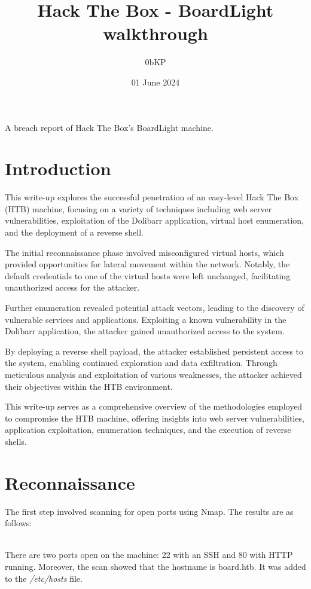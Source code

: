 \documentclass[12pt, letterpaper]{article}
\title{Hack The Box - BoardLight walkthrough}
\author{0bKP}
\date{01 June 2024}
\begin{document}
\maketitle
A breach report of Hack The Box's BoardLight machine.

\tableofcontents

\section{Introduction}
This write-up explores the successful penetration of an easy-level Hack The Box (HTB) 
machine, focusing on a variety of techniques including web server vulnerabilities,
exploitation of the Dolibarr application, virtual host enumeration, and the deployment 
of a reverse shell.

The initial reconnaissance phase involved misconfigured virtual hosts, which provided 
opportunities for lateral movement within the network. Notably, the default credentials 
to one of the virtual hosts were left unchanged, facilitating unauthorized access for the attacker.

Further enumeration revealed potential attack vectors, leading to the discovery of vulnerable 
services and applications. Exploiting a known vulnerability in the Dolibarr application, the 
attacker gained unauthorized access to the system.

By deploying a reverse shell payload, the attacker established persistent access to the 
system, enabling continued exploration and data exfiltration. Through meticulous analysis 
and exploitation of various weaknesses, the attacker achieved their objectives within the 
HTB environment.

This write-up serves as a comprehensive overview of the methodologies employed to compromise 
the HTB machine, offering insights into web server vulnerabilities, application exploitation, 
enumeration techniques, and the execution of reverse shells.

\section{Reconnaissance}

The first step involved scanning for open ports using Nmap. The results
are as follows: 
\\\\
\noindent   

There are two ports open on the machine: 22 with an SSH and 80 with HTTP running.
Moreover, the scan showed that the hostname is board.htb. It was added to the
\textit{/etc/hosts} file.
\end{document}
